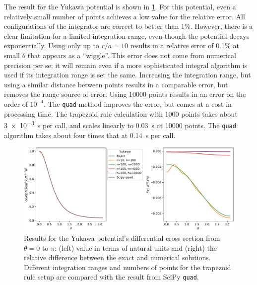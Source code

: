 \documentclass{project}
\begin{document}
The result for the Yukawa potential is shown in \cref{fig:yukawa}. %
For this potential, even a relatively small number of points achieves a low value for the relative error. All configurations of the integrator are correct to better than 1\%. However, there is a clear limitation for a limited integration range, even though the potential decays exponentially. Using only up to $r/a=10$ results in a relative error of 0.1\% at small $\theta$ that appears as a ``wiggle''.
This error does not come from numerical precision per se; it will remain even if a more sophisticated integral algorithm is used if its integration range is set the same. Increasing the integration range, but using a similar distance between points results in a comparable error, but removes the range source of error. Using 10000 points results in an error on the order of $10^{-4}$. The \texttt{quad} method improves the error, but comes at a cost in processing time. The trapezoid rule calculation with 1000 points takes about \SI{3e-3}{\second} per call, and scales linearly to \SI{0.03}{\second} at 10000 points. The \texttt{quad} algorithm takes about four times that at \SI{0.14}{\second} per call.

\begin{figure}[tbp] %
  \begin{center}
  \includegraphics[width=\textwidth]{fig/example/yukawa_born_xs}
  \caption{Results for the Yukawa potential's differential cross section from $\theta=0$ to $\pi$: (left) value in terms of natural units and (right) the relative difference between the exact and numerical solutions. Different integration ranges and numbers of points for the trapezoid rule setup are compared with the result from SciPy \texttt{quad}.\label{fig:yukawa}}
  \end{center}
\end{figure}
\end{document}
